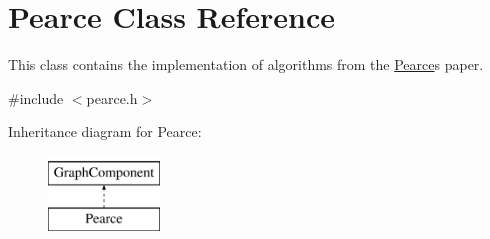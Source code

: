 \hypertarget{class_pearce}{}\section{Pearce Class Reference}
\label{class_pearce}


This class contains the implementation of algorithms from the \hyperlink{class_pearce}{Pearce}\textquotesingle{}s paper.  




{\ttfamily \#include $<$pearce.\+h$>$}

Inheritance diagram for Pearce\+:\begin{figure}[H]
\begin{center}
\leavevmode
\includegraphics[height=2.000000cm]{class_pearce}
\end{center}
\end{figure}
